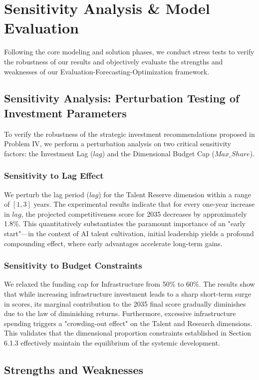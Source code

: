 \documentclass[12pt]{article}
\begin{document}
	\section{Sensitivity Analysis \& Model Evaluation}
	Following the core modeling and solution phases, we conduct stress tests to verify the robustness of our results and objectively evaluate the strengths and weaknesses of our Evaluation-Forecasting-Optimization framework.
	\subsection{Sensitivity Analysis: Perturbation Testing of Investment Parameters}
	To verify the robustness of the strategic investment recommendations proposed in Problem IV, we perform a perturbation analysis on two critical sensitivity factors: the Investment Lag ($lag$) and the Dimensional Budget Cap ($Max\_Share$).
	\subsubsection{Sensitivity to Lag Effect}
	We perturb the lag period ($lag$) for the Talent Reserve dimension within a range of $[1, 3]$ years. The experimental results indicate that for every one-year increase in $lag$, the projected competitiveness score for 2035 decreases by approximately 1.8\%. This quantitatively substantiates the paramount importance of an "early start"—in the context of AI talent cultivation, initial leadership yields a profound compounding effect, where early advantages accelerate long-term gains.
	\subsubsection{Sensitivity to Budget Constraints}
	We relaxed the funding cap for Infrastructure from 50\% to 60\%. The results show that while increasing infrastructure investment leads to a sharp short-term surge in scores, its marginal contribution to the 2035 final score gradually diminishes due to the law of diminishing returns. Furthermore, excessive infrastructure spending triggers a "crowding-out effect" on the Talent and Research dimensions. This validates that the dimensional proportion constraints established in Section 6.1.3 effectively maintain the equilibrium of the systemic development.
	
	\subsection{Strengths and Weaknesses}
\end{document}
